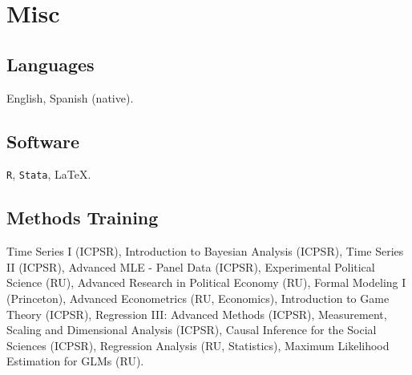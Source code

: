 \documentclass[letterpaper]{article}
\begin{document}
\section*{Misc}

\subsection*{Languages}
English, Spanish (native).


\subsection*{Software}
\texttt{R}, \texttt{Stata}, \LaTeX.

\subsection*{Methods Training}
Time Series I (ICPSR), Introduction to Bayesian Analysis (ICPSR), Time Series II (ICPSR), Advanced MLE - Panel Data (ICPSR), Experimental Political Science (RU), Advanced Research in Political Economy (RU), Formal Modeling I (Princeton), Advanced Econometrics (RU, Economics), Introduction to Game Theory (ICPSR), Regression III: Advanced Methods (ICPSR), Measurement, Scaling and Dimensional Analysis (ICPSR), Causal Inference for the Social Sciences (ICPSR), Regression Analysis (RU, Statistics), Maximum Likelihood Estimation for GLMs (RU).




\bigskip
\end{document}
